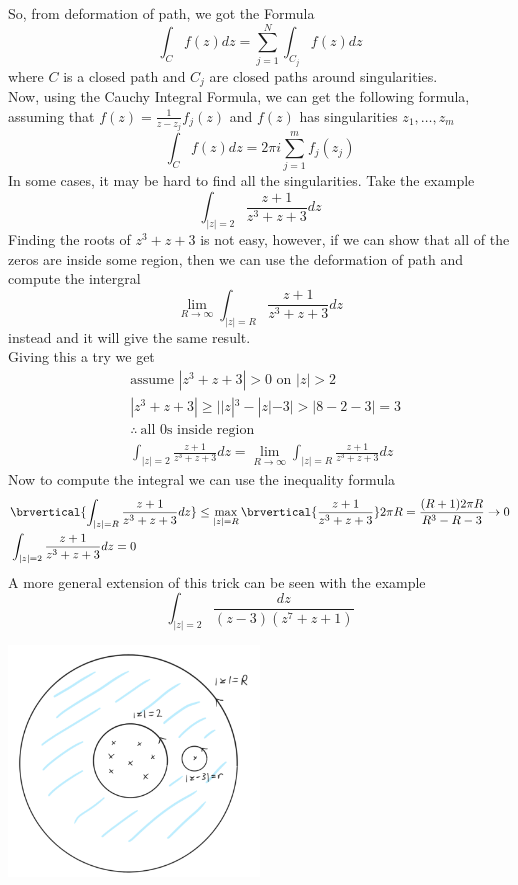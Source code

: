 So, from deformation of path, we got the Formula
\[\int_Cf(z)dz=\sum_{j=1}^N\int_{C_j}f(z)dz\]
where $C$ is a closed path and $C_j$ are closed paths around singularities.\\
Now, using the Cauchy Integral Formula, we can get the following formula, assuming that $f(z)=\frac{1}{z-z_j}f_j(z)$ and $f(z)$ has singularities $z_1,\ldots,z_m$
\[\int_C f(z)dz=2\pi i\sum_{j=1}^m f_j(z_j)\]
In some cases, it may be hard to find all the singularities. Take the example
\[\int_{|z|=2}\frac{z+1}{z^3+z+3}dz\]
Finding the roots of $z^3+z+3$ is not easy, however, if we can show that all of the zeros are inside some region, then we can use the deformation of path and compute the intergral
\[\lim_{R\to\infty}\int_{|z|=R}\frac{z+1}{z^3+z+3}dz\]
instead and it will give the same result.\\
Giving this a try we get
\begin{align*}
    &\text{assume }|z^3+z+3|>0\text{ on }|z|> 2\\
    &|z^3+z+3|\geq ||z|^3-|z|-3|>|8-2-3|=3\\
    &\therefore\ \text{all 0s inside region}\\
    &\int_{|z|=2}\frac{z+1}{z^3+z+3}dz=\lim_{R\to\infty}\int_{|z|=R}\frac{z+1}{z^3+z+3}dz
\end{align*}
Now to compute the integral we can use the inequality formula
\begin{align*}
    &\brvertical{\int_{|z|=R}\frac{z+1}{z^3+z+3}dz}\leq\max_{|z|=R}\brvertical{\frac{z+1}{z^3+z+3}}2\pi R=\frac{(R+1)2\pi R}{R^3-R-3}\to0\\
    &\int_{|z|=2}\frac{z+1}{z^3+z+3}dz=0
\end{align*}
A more general extension of this trick can be seen with the example
\[\int_{|z|=2}\frac{dz}{(z-3)(z^7+z+1)}\]
\centerline{\includegraphics[width=0.5\textwidth]{Images/ComplexAnalysisPictures/DeformationOfPathEx.png}}
